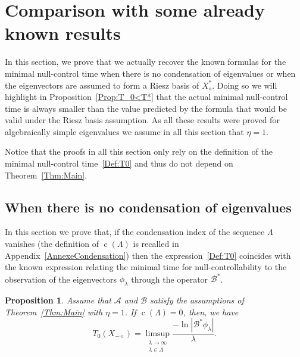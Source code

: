 \documentclass[11pt]{article}
\newtheorem{prop}[theo]{Proposition}
\theoremstyle{definition}
\numberwithin{equation}{section}
\numberwithin{figure}{section}
\numberwithin{table}{section}
\newcommand\A{\mathcal{A}}
\newcommand\B{\mathcal{B}}
\newcommand\Bs{\mathcal{B}^*}
\newcommand{\Xalphas}{X_\diamond^*}
\newcommand{\Xmalpha}{X_{-\diamond}}
\DeclareMathOperator{\cond}{c}
\begin{document}
\section{Comparison with some already known results} \label{Sec:AutresExpressions}

In this section, we prove that we actually recover the known formulas for the minimal null-control time when there is no condensation of eigenvalues or when the eigenvectors are assumed to form a Riesz basis of $\Xalphas$. Doing so we will highlight in Proposition~\ref{Prop:T_0<T*} that the actual minimal null-control time is always smaller than the value predicted by the formula that would be valid under the Riesz basis assumption. As all these results were proved for algebraically simple eigenvalues we assume in all this section that $\eta=1$.

Notice that the proofs in all this section only rely on the definition of the minimal null-control time~\eqref{Def:T0} and thus do not depend on Theorem~\ref{Thm:Main}.


\subsection{When there is no condensation of eigenvalues} \label{Subsec:NoCondensation}

In this section we prove that, if the condensation index of the sequence $\Lambda$ vanishes (the definition of $\cond(\Lambda)$ is recalled in Appendix~\ref{AnnexeCondensation}) then the expression~\eqref{Def:T0} coincides with the known expression relating the minimal time for null-controllability to the observation of the eigenvectors $\phi_\lambda$ through the operator $\Bs$.

\begin{prop}
Assume that $\A$ and $\B$ satisfy the assumptions of Theorem~\ref{Thm:Main} with $\eta=1$. If $\cond(\Lambda) =0$, then, we have
\[
T_{0}(\Xmalpha)=\limsup_{\substack{\lambda\to \infty\\ \lambda\in \Lambda}} \frac{-\ln \left| \Bs \phi_\lambda \right|}{\lambda}.
\]
\end{prop}
\end{document}

